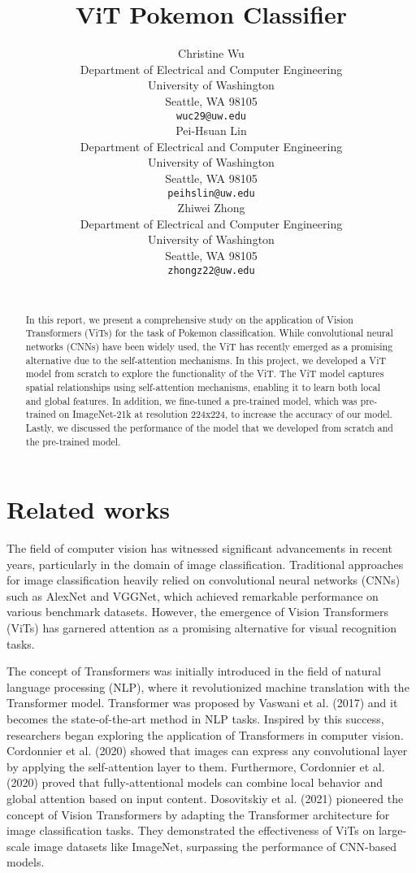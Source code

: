 \documentclass{article} %
\title{ViT Pokemon Classifier}
\author{
Christine Wu\\
Department of Electrical and Computer Engineering\\
University of Washington\\
Seattle, WA 98105 \\
\texttt{wuc29@uw.edu} \\
\And
Pei-Hsuan Lin \\
Department of Electrical and Computer Engineering\\
University of Washington\\
Seattle, WA 98105 \\
\texttt{peihslin@uw.edu} \\
\AND
Zhiwei Zhong \\
Department of Electrical and Computer Engineering\\
University of Washington\\
Seattle, WA 98105 \\
\texttt{zhongz22@uw.edu} \\
\\
}
\begin{document}
\maketitle

\begin{abstract}
In this report, we present a comprehensive study on the application of Vision Transformers 
(ViTs) for the task of Pokemon classification. While convolutional neural networks (CNNs) 
have been widely used, the ViT has recently emerged as a promising alternative due to the 
self-attention mechanisms. In this project, we developed a ViT model from scratch to explore
 the functionality of the ViT. The ViT model captures spatial relationships using 
 self-attention mechanisms, enabling it to learn both local and global features. 
 In addition, we fine-tuned a pre-trained model, which was pre-trained on ImageNet-21k at 
 resolution 224x224, to increase the accuracy of our model. Lastly, we discussed the 
 performance of the model that we developed from scratch and the pre-trained model.
\end{abstract}

\section{Related works}
The field of computer vision has witnessed significant advancements in recent years, 
particularly in the domain of image classification. Traditional approaches for image 
classification heavily relied on convolutional neural networks (CNNs) such as AlexNet 
and VGGNet, which achieved remarkable performance on various benchmark datasets. However, 
the emergence of Vision Transformers (ViTs) has garnered attention as a promising 
alternative for visual recognition tasks.

The concept of Transformers was initially introduced in the field of natural language 
processing (NLP), where it revolutionized machine translation with the Transformer model. 
Transformer was proposed by Vaswani et al. (2017) and it becomes the state-of-the-art 
method in NLP tasks. Inspired by this success, researchers began exploring the application 
of Transformers in computer vision. Cordonnier et al. (2020) showed that images can express 
any convolutional layer by applying the self-attention layer to them. Furthermore, 
Cordonnier et al. (2020) proved that fully-attentional models can combine local behavior 
and global attention based on input content. Dosovitskiy et al. (2021) pioneered the 
concept of Vision Transformers by adapting the Transformer architecture for image 
classification tasks. They demonstrated the effectiveness of ViTs on large-scale image 
datasets like ImageNet, surpassing the performance of CNN-based models.
\end{document}
